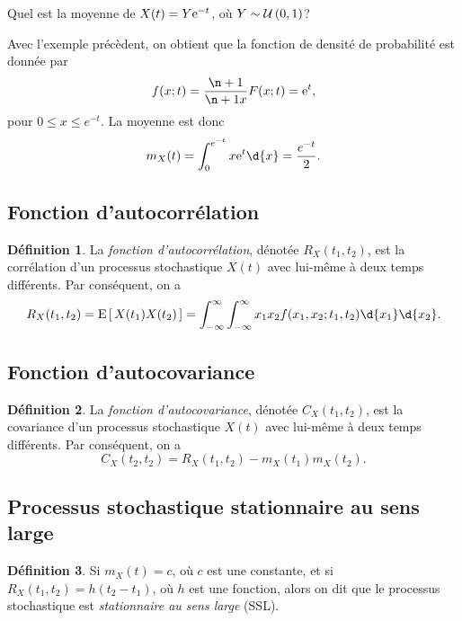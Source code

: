 \documentclass[11pt]{article}
\makeatletter
\newcommand\e{%
	\ensuremath{%
		\mathrm{e}%
	}%
}%
\newcommand\Uni[2]{%
	\ensuremath{%
		\mathcal{U}\left(#1,#2\right)%
	}%
}%
\newcommand\Esp[1]{%
	\ensuremath{%
		\mathrm{E}\left[\,#1\,\right]%
	}%
}%
\theoremstyle{remark}
\theoremstyle{definition}
\newtheorem*{@definition}{Définition}
\newenvironment{definition}{%
	\begin{@definition}%
}{%
	\end{@definition}%
	\setcounter{property}{0}%
}
\makeatother
\begin{document}
\begin{exemple}
	Quel est la moyenne de $X(t)=Y\e^{-t}$, où $Y\sim\Uni{0}{1}$?

	Avec l'exemple précèdent, on obtient que la fonction de densité de
	probabilité est donnée par
	\begin{equation*}
		f(x;t)=\frac{\p{}}{\p{x}}F(x;t)=\e^t,
	\end{equation*}
	pour $0\leq x\leq e^{-t}$. La moyenne est donc
	\begin{equation*}
		m_X(t)=\int_0^{e^{-t}}x\e^t\d{x}=\frac{e^{-t}}{2}.
	\end{equation*}
\end{exemple}

\subsection{Fonction d'autocorrélation}
\begin{definition}
	La \textit{fonction d'autocorrélation}, dénotée $R_X(t_1,t_2)$, est la
	corrélation d'un processus stochastique $X(t)$ avec lui-même à deux temps
	différents. Par conséquent, on a
	\begin{equation*}
		R_X(t_1,t_2)
		=\Esp{X(t_1)X(t_2)}
		=\int_{-\infty}^\infty\int_{-\infty}^\infty
			x_1x_2f(x_1,x_2;t_1,t_2)\d{x_1}\d{x_2}.
	\end{equation*}
\end{definition}

\subsection{Fonction d'autocovariance}
\begin{definition}
	La \textit{fonction d'autocovariance}, dénotée $C_X(t_1,t_2)$, est la
	covariance d'un processus stochastique $X(t)$ avec lui-même à deux temps
	différents. Par conséquent, on a
	\begin{equation*}
		C_X(t_2,t_2)
		=R_X(t_1,t_2)-m_X(t_1)m_X(t_2).
	\end{equation*}
\end{definition}

\subsection{Processus stochastique stationnaire au sens large}
\begin{definition}
	Si $m_X(t)=c$, où $c$ est une constante, et si $R_X(t_1,t_2)=h(t_2-t_1)$, où
	$h$ est une fonction, alors on dit que le processus stochastique est
	\textit{stationnaire au sens large} (SSL).
\end{definition}
\end{document}
